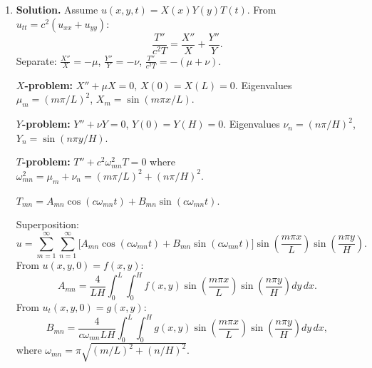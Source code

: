 \begin{enumerate}
Characteristic equations: $\frac{dx}{1+x^2}=\frac{dy}{1}=\frac{du}{0}$.

From $\frac{dx}{1+x^2}=dy$: $\arctan x = y + c$, so $c=\arctan x - y$.

Since $u$ is constant along characteristics: $u=\phi(\arctan x-y)$.

Apply $u(x,0)=\frac{1}{1+x^2}$: $\phi(\arctan x)=\frac{1}{1+x^2}$. Let $\theta=\arctan x$, then $x=\tan\theta$ and $\frac{1}{1+x^2}=\cos^2\theta$. So $\phi(\theta)=\cos^2\theta$.

Therefore:
\[
\boxed{u(x,y)=\cos^2(\arctan x - y)}.
\]

\item \textbf{Solution.}
Assume $u(x,y,t)=X(x)Y(y)T(t)$. From $u_{tt}=c^2(u_{xx}+u_{yy})$:
\[
\frac{T''}{c^2 T}=\frac{X''}{X}+\frac{Y''}{Y}.
\]
Separate: $\frac{X''}{X}=-\mu$, $\frac{Y''}{Y}=-\nu$, $\frac{T''}{c^2 T}=-(\mu+\nu)$.

\textbf{$X$-problem:} $X''+\mu X=0$, $X(0)=X(L)=0$. Eigenvalues $\mu_m=(m\pi/L)^2$, $X_m=\sin(m\pi x/L)$.

\textbf{$Y$-problem:} $Y''+\nu Y=0$, $Y(0)=Y(H)=0$. Eigenvalues $\nu_n=(n\pi/H)^2$, $Y_n=\sin(n\pi y/H)$.

\textbf{$T$-problem:} $T''+c^2\omega_{mn}^2 T=0$ where $\omega_{mn}^2=\mu_m+\nu_n=(m\pi/L)^2+(n\pi/H)^2$.

$T_{mn}=A_{mn}\cos(c\omega_{mn}t)+B_{mn}\sin(c\omega_{mn}t)$.

Superposition:
\[
u = \sum_{m=1}^{\infty}\sum_{n=1}^{\infty}\bigl[A_{mn}\cos(c\omega_{mn}t)+B_{mn}\sin(c\omega_{mn}t)\bigr]\sin\!\left(\frac{m\pi x}{L}\right)\sin\!\left(\frac{n\pi y}{H}\right).
\]
From $u(x,y,0)=f(x,y)$:
\[
A_{mn}=\frac{4}{LH}\int_0^L\int_0^H f(x,y)\sin\!\left(\frac{m\pi x}{L}\right)\sin\!\left(\frac{n\pi y}{H}\right)dy\,dx.
\]
From $u_t(x,y,0)=g(x,y)$:
\[
\boxed{B_{mn}=\frac{4}{c\omega_{mn}LH}\int_0^L\int_0^H g(x,y)\sin\!\left(\frac{m\pi x}{L}\right)\sin\!\left(\frac{n\pi y}{H}\right)dy\,dx},
\]
where $\omega_{mn}=\pi\sqrt{(m/L)^2+(n/H)^2}$.

\end{enumerate}
